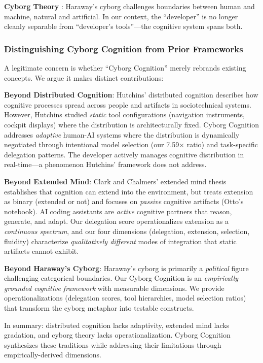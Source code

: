 \textbf{Cyborg Theory} \cite{haraway1991cyborg}: Haraway's cyborg challenges boundaries between human and machine, natural and artificial. In our context, the ``developer'' is no longer cleanly separable from ``developer's tools''---the cognitive system spans both.

\subsubsection{Distinguishing Cyborg Cognition from Prior Frameworks}

A legitimate concern is whether ``Cyborg Cognition'' merely rebrands existing concepts. We argue it makes distinct contributions:

\textbf{Beyond Distributed Cognition}: Hutchins' \cite{hutchins1995cognition} distributed cognition describes how cognitive processes spread across people and artifacts in sociotechnical systems. However, Hutchins studied \textit{static} tool configurations (navigation instruments, cockpit displays) where the distribution is architecturally fixed. Cyborg Cognition addresses \textit{adaptive} human-AI systems where the distribution is dynamically negotiated through intentional model selection (our 7.59$\times$ ratio) and task-specific delegation patterns. The developer actively manages cognitive distribution in real-time---a phenomenon Hutchins' framework does not address.

\textbf{Beyond Extended Mind}: Clark and Chalmers' \cite{clark1998extended} extended mind thesis establishes that cognition can extend into the environment, but treats extension as binary (extended or not) and focuses on \textit{passive} cognitive artifacts (Otto's notebook). AI coding assistants are \textit{active} cognitive partners that reason, generate, and adapt. Our delegation score operationalizes extension as a \textit{continuous spectrum}, and our four dimensions (delegation, extension, selection, fluidity) characterize \textit{qualitatively different} modes of integration that static artifacts cannot exhibit.

\textbf{Beyond Haraway's Cyborg}: Haraway's cyborg is primarily a \textit{political} figure challenging categorical boundaries. Our Cyborg Cognition is an \textit{empirically grounded cognitive framework} with measurable dimensions. We provide operationalizations (delegation scores, tool hierarchies, model selection ratios) that transform the cyborg metaphor into testable constructs.

In summary: distributed cognition lacks adaptivity, extended mind lacks gradation, and cyborg theory lacks operationalization. Cyborg Cognition synthesizes these traditions while addressing their limitations through empirically-derived dimensions.

